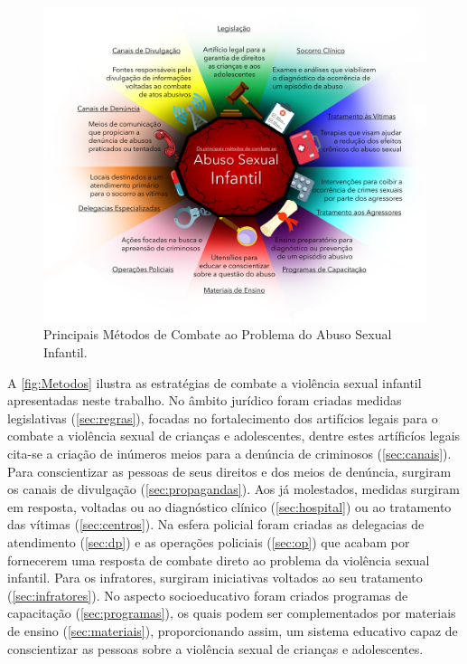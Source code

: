 \begin{figure}[htb]
	\caption{\label{fig:Metodos}Principais Métodos de Combate ao Problema do Abuso Sexual Infantil.}\vspace{-0.4cm}
  \begin{adjustwidth}{-4.2cm}{-0.0cm}
    \includegraphics[scale=0.65]{./Visuais/MétodosCombate.pdf}
	\end{adjustwidth}\vspace{-1.0cm}
\end{figure}

A \autoref{fig:Metodos} ilustra as estratégias de combate a violência sexual infantil apresentadas neste trabalho. No âmbito jurídico foram criadas medidas legislativas (\autoref{sec:regras}), focadas no fortalecimento dos artifícios legais para o combate a violência sexual de crianças e adolescentes, dentre estes artíficíos legais cita-se a criação de inúmeros meios para a denúncia de criminosos (\autoref{sec:canais}). Para conscientizar as pessoas de seus direitos e dos meios de denúncia, surgiram os canais de divulgação (\autoref{sec:propagandas}). Aos já molestados, medidas surgiram em resposta, voltadas ou ao diagnóstico clínico (\autoref{sec:hospital}) ou ao tratamento das vítimas (\autoref{sec:centros}). Na esfera policial foram criadas as delegacias de atendimento (\autoref{sec:dp}) e as operações policiais (\autoref{sec:op}) que acabam por fornecerem uma resposta de combate direto ao problema da violência sexual infantil. Para os infratores, surgiram iniciativas voltados ao seu tratamento  (\autoref{sec:infratores}). No aspecto socioeducativo foram criados programas de capacitação (\autoref{sec:programas}), os quais podem ser complementados por materiais de ensino (\autoref{sec:materiais}), proporcionando assim, um sistema educativo capaz de conscientizar as pessoas sobre a violência sexual de crianças e adolescentes. 

